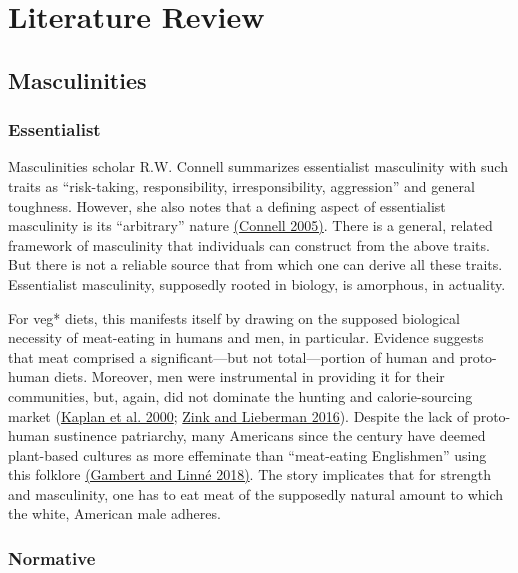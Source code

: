 \pagestyle{fancy}
\fancyhf{}
\fancyfoot[LE,RO]{\thepage}

\twocolumn

\section{Literature Review}

\subsection{Masculinities}

\subsubsection{Essentialist}

Masculinities scholar R.W. Connell summarizes essentialist masculinity with such traits as ``risk-taking, responsibility, irresponsibility, aggression'' and general toughness. However, she also notes that a defining aspect of essentialist masculinity is its ``arbitrary'' nature \hyperlink{connell}{(Connell 2005)}. There is a general, related framework of masculinity that individuals can construct from the above traits. But there is not a reliable source that from which one can derive all these traits. Essentialist masculinity, supposedly rooted in biology, is amorphous, in actuality.

For veg* diets, this manifests itself by drawing on the supposed biological necessity of meat-eating in humans and men, in particular. Evidence suggests that meat comprised a significant---but not total---portion of human and proto-human diets. Moreover, men were instrumental in providing it for their communities, but, again, did not dominate the hunting and calorie-sourcing market (\hyperlink{kaplan}{Kaplan et al. 2000}; \hyperlink{zink}{Zink and Lieberman 2016}). Despite the lack of proto-human sustinence patriarchy, many Americans since the  century have deemed plant-based cultures as more effeminate than ``meat-eating Englishmen'' using this folklore \hyperlink{gambert}{(Gambert and Linné 2018)}. The story implicates that for strength and masculinity, one has to eat meat of the supposedly natural amount to which the white, American male adheres.

\subsubsection{Normative}

